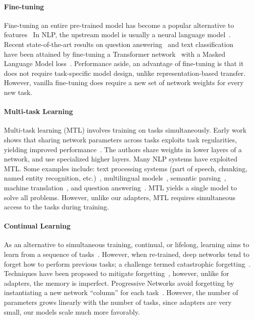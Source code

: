 \paragraph{Fine-tuning}
Fine-tuning an entire pre-trained model has become a popular alternative to features~\citep{dai2015,howard2018universal,radford2018improving} In NLP, the upstream model is usually a neural language model~\citep{bengio2003}. Recent state-of-the-art results on question answering~\citep{rajpurkar2016} and text classification~\citep{wang2018glue} have been attained by fine-tuning a Transformer network~\citep{vaswani2017} with a Masked Language Model loss~\citep{devlin2018bert}. Performance aside, an advantage of fine-tuning is that it does not require task-specific model design, unlike representation-based transfer. However, vanilla fine-tuning does require a new set of network weights for every new task.

\paragraph{Multi-task Learning} Multi-task learning (MTL) involves training on tasks simultaneously. Early work shows that sharing network parameters across tasks exploits task regularities, yielding improved performance~\citep{caruana1997}. The authors share weights in lower layers of a network, and use specialized higher layers. Many NLP systems have exploited MTL. Some examples include: text processing systems (part of speech, chunking, named entity recognition, etc.)~\citep{collobert2008}, multilingual models~\citep{huang2013cross}, semantic parsing~\citep{peng2017}, machine translation~\citep{johnson2017}, and question answering~\citep{choi2017}. MTL yields a single model to solve all problems. However, unlike our adapters, MTL requires simultaneous access to the tasks during training.

\paragraph{Continual Learning} As an alternative to simultaneous training, continual, or lifelong, learning aims to learn from a sequence of tasks~\citep{thrun1998}. However, when re-trained, deep networks tend to forget how to perform previous tasks; a challenge termed catastrophic forgetting~\citep{mccloskey1989catastrophic,french1999catastrophic}. Techniques have been proposed to mitigate forgetting~\citep{kirkpatrick2017overcoming,zenke2017continual}, however, unlike for adapters, the memory is imperfect. Progressive Networks avoid forgetting by instantiating a new network ``column'' for each task~\citep{rusu2016progressive}. However, the number of parameters grows linearly with the number of tasks, since adapters are very small, our models scale much more favorably.


